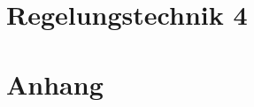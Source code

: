 \documentclass[8pt, a4paper, twoside]{extarticle}
\begin{document}
    \begin{layout}
        \part{Regelungstechnik 4}
        
        
        
        
        
        
        
        
        
        
        \part{Anhang}
        
    \end{layout}

    
\end{document}

